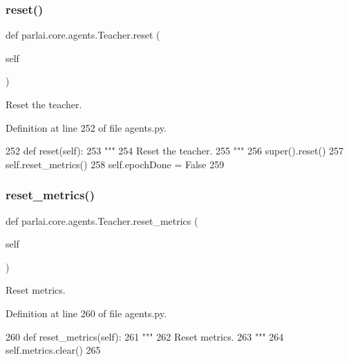 \subsubsection{\texorpdfstring{reset()}{reset()}}
{\footnotesize\ttfamily def parlai.\+core.\+agents.\+Teacher.\+reset (\begin{DoxyParamCaption}\item[{}]{self }\end{DoxyParamCaption})}

\begin{DoxyVerb}Reset the teacher.
\end{DoxyVerb}
 

Definition at line 252 of file agents.\+py.


\begin{DoxyCode}
252     \textcolor{keyword}{def }reset(self):
253         \textcolor{stringliteral}{"""}
254 \textcolor{stringliteral}{        Reset the teacher.}
255 \textcolor{stringliteral}{        """}
256         super().reset()
257         self.reset\_metrics()
258         self.epochDone = \textcolor{keyword}{False}
259 
\end{DoxyCode}
\mbox{\label{classparlai_1_1core_1_1agents_1_1Teacher_a3f14618f0f49c57a6fbcb4f80f8a1de4}} 
\subsubsection{\texorpdfstring{reset\+\_\+metrics()}{reset\_metrics()}}
{\footnotesize\ttfamily def parlai.\+core.\+agents.\+Teacher.\+reset\+\_\+metrics (\begin{DoxyParamCaption}\item[{}]{self }\end{DoxyParamCaption})}

\begin{DoxyVerb}Reset metrics.
\end{DoxyVerb}
 

Definition at line 260 of file agents.\+py.


\begin{DoxyCode}
260     \textcolor{keyword}{def }reset\_metrics(self):
261         \textcolor{stringliteral}{"""}
262 \textcolor{stringliteral}{        Reset metrics.}
263 \textcolor{stringliteral}{        """}
264         self.metrics.clear()
265 
\end{DoxyCode}
\mbox{\label{classparlai_1_1core_1_1agents_1_1Teacher_a43cf8d0b49ef4ff150ceef0149c063c3}} 
